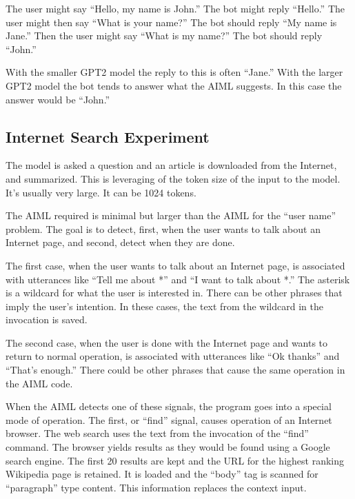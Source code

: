 The user might say ``Hello, my name is John.'' The bot might reply ``Hello.'' The user might then say ``What is your name?'' The bot should reply ``My name is Jane.'' Then the user might say ``What is my name?'' The bot should reply ``John.''

With the smaller GPT2 model the reply to this is often ``Jane.'' 
With the larger GPT2 model the bot tends to answer what the AIML suggests. In this case the answer would be ``John.''

\subsection{Internet Search Experiment}
The model is asked a question and an article is downloaded from the Internet, and summarized. This is leveraging of the token size of the input to the model. It's usually very large. It can be 1024 tokens.

The AIML required is minimal but larger than the AIML for the ``user name'' problem. The goal is to detect, first, when the user wants to talk about an Internet page, and second, detect when they are done.

The first case, when the user wants to talk about an Internet page, is associated with utterances like ``Tell me about *'' and ``I want to talk about *.'' The asterisk is a wildcard for what the user is interested in. There can be other phrases that imply the user's intention. In these cases, the text from the wildcard in the invocation is saved.

The second case, when the user is done with the Internet page and wants to return to normal operation, is associated with utterances like ``Ok thanks'' and ``That's enough.'' 
There could be other phrases that cause the same operation in the AIML code.

When the AIML detects one of these signals, the program goes into a special mode of operation. The first, or ``find'' signal, causes operation of an Internet browser. The web search uses the text from the invocation of the ``find'' command. The browser yields results as they would be found using a Google search engine. The first 20 results are kept and the URL for the highest ranking Wikipedia page is retained. It is loaded and the ``body'' tag is scanned for ``paragraph'' type content. This information replaces the context input. 

